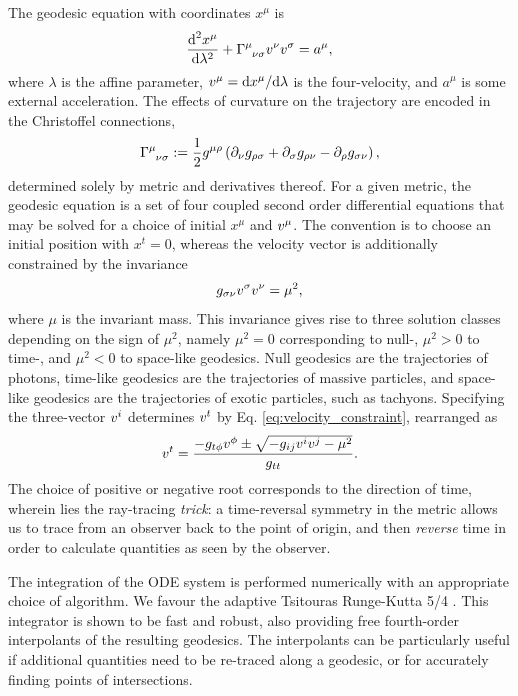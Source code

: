 The geodesic equation with coordinates $x^\mu$ is
\begin{equation}
\label{eq:geodesic_equation}
    \frac{\d^2 x^\mu}{\d \lambda^2}
    + \utensor{\Gamma}{\mu}{\nu\sigma}
    \vel{\nu}
    \vel{\sigma}
    = a^\mu,
\end{equation}
where $\lambda$ is the affine parameter, $v^\mu = \text{d} x^\mu / \text{d} \lambda$ is the four-velocity, and $a^\mu$ is some external acceleration. The effects of curvature on the trajectory are encoded in the Christoffel connections, 
\begin{equation}
\label{eq:christoffel}
    \utensor{\Gamma}{\mu}{\nu\sigma}
    := \frac{1}{2} g^{\mu\rho} 
    \left(
        \partial_{\nu}g_{\rho \sigma}
        + \partial_{\sigma}g_{\rho \nu}
        - \partial_{\rho}g_{\sigma \nu}
    \right),
\end{equation}
determined solely by metric and derivatives thereof. For a given metric, the geodesic equation is a set of four coupled second order differential equations that may be solved for a choice of initial $x^\mu$ and $v^{\mu}$. The convention is to choose an initial position with $x^t = 0$, whereas the velocity vector is additionally constrained by the invariance
\begin{equation}
\label{eq:velocity_constraint}
    g_{\sigma\nu} v^{\sigma} v^{\nu} = \mu^2,
\end{equation}
where $\mu$ is the invariant mass. This invariance gives rise to three solution classes depending on the sign of $\mu^2$, namely $\mu^2 = 0$ corresponding to null-, $\mu^2 > 0$ to time-, and $\mu^2 < 0$ to space-like geodesics. Null geodesics are the trajectories of photons, time-like geodesics are the trajectories of massive particles, and space-like geodesics are the trajectories of exotic particles, such as tachyons. Specifying the three-vector $v^{i}$ determines $v^{t}$ by Eq. \eqref{eq:velocity_constraint}, rearranged as
\begin{equation}
v^{t}  = \frac{-g_{t\phi} v^{\phi} \pm
    \sqrt{-g_{ij} v^{i} v^{j} - \mu^2}
}{g_{tt}}.
\end{equation}
The choice of positive or negative root corresponds to the direction of time, wherein lies the ray-tracing \textit{trick}: a time-reversal symmetry in the metric allows us to trace from an observer back to the point of origin, and then \textit{reverse} time in order to calculate quantities as seen by the observer. 

The integration of the ODE system is performed numerically with an appropriate choice of algorithm. We favour the adaptive Tsitouras Runge-Kutta 5/4 \citep{tsitouras_rungekutta_2011}. This integrator is shown to be fast and robust, also providing free fourth-order interpolants of the resulting geodesics. The interpolants can be particularly useful if additional quantities need to be re-traced along a geodesic, or for accurately finding points of intersections.

